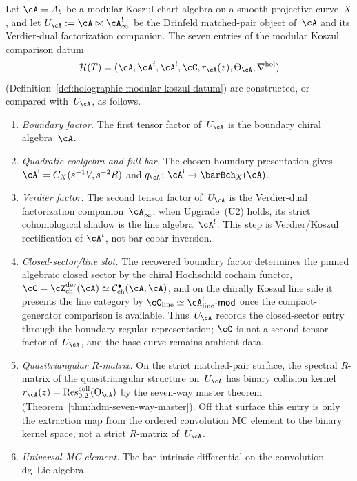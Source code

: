 \begin{proposition}
Let $\cA = A_b$ be a modular Koszul chart algebra on a smooth
projective curve~$X$, and let $U_\cA := \cA \bowtie \cA^{!}_\infty$ be
the Drinfeld matched-pair object of~$\cA$ and its Verdier-dual
factorization companion.
The seven entries of the modular Koszul comparison datum
\[
\mathcal{H}(T)
=
(\cA,\cA^i,\cA^!,\cC,r_\cA(z),\Theta_\cA,\nabla^{\mathrm{hol}})
\]
(Definition~\ref{def:holographic-modular-koszul-datum}) are
constructed, or compared with~$U_\cA$, as follows.
\begin{enumerate}[label=\textup{(R\arabic*)}]
\item \emph{Boundary factor.} The first tensor factor of~$U_\cA$ is
 the boundary chiral algebra~$\cA$.
\item \emph{Quadratic coalgebra and full bar.} The chosen boundary
 presentation gives
 $\cA^{\mathrm i}=C_X(s^{-1}V,s^{-2}R)$ and
 $q_\cA\colon\cA^{\mathrm i}\to\barBch_X(\cA)$.
\item \emph{Verdier factor.} The second tensor factor of~$U_\cA$ is
 the Verdier-dual factorization companion~$\cA^{!}_\infty$; when
 Upgrade~\textup{(U2)} holds, its strict cohomological shadow is the
 line algebra~$\cA^!$. This step is Verdier/Koszul rectification of
 $\cA^i$, not bar-cobar inversion.
\item \emph{Closed-sector/line slot.} The recovered boundary factor determines
 the pinned algebraic closed sector by the chiral Hochschild cochain functor,
 $\cC=\cZ^{\mathrm{der}}_{\mathrm{ch}}(\cA)
 \simeq \mathcal{C}^{\bullet}_{\mathrm{ch}}(\cA,\cA)$, and on the
 chirally Koszul line side it presents the line category by
 $\cC_{\mathrm{line}} \simeq
 \cA^!_{\mathrm{line}}\text{-}\mathsf{mod}$ once the compact-generator
 comparison is available. Thus~$U_\cA$ records the closed-sector entry through
 the boundary regular representation; $\cC$ is not a second tensor
 factor of~$U_\cA$, and the base curve remains ambient data.
\item \emph{Quasitriangular $R$-matrix.} On the strict matched-pair
 surface, the spectral $R$-matrix of the quasitriangular structure
 on~$U_\cA$ has binary collision kernel
 $r_\cA(z) = \operatorname{Res}^{\mathrm{coll}}_{0,2}(\Theta_\cA)$ by
 the seven-way master theorem
 (Theorem~\ref{thm:hdm-seven-way-master}). Off that surface this entry
 is only the extraction map from the ordered convolution MC element to
 the binary kernel space, not a strict $R$-matrix of~$U_\cA$.
\item \emph{Universal MC element.} The bar-intrinsic differential on
 the convolution dg~Lie algebra

\end{enumerate}
\end{proposition}

